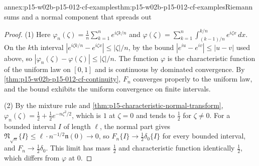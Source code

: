 \begin{annexitem}{annex:p15-w02b-p15-012-cf-examples}{thm:p15-w02b-p15-012-cf-examples}{Riemann sums and a normal component that spreads out}
\begin{proof}
(1) Here \(\varphi_n(\zeta)=\frac1n\sum_{k=1}^ne^{i\zeta k/n}\) and
\(\varphi(\zeta)=\sum_{k=1}^n\int_{(k-1)/n}^{k/n}e^{i\zeta x}\,dx\). On the
\(k\)th interval \(|e^{i\zeta k/n}-e^{i\zeta x}|\leq|\zeta|/n\), by the bound
\(|e^{iu}-e^{iv}|\leq|u-v|\) used above, so
\(|\varphi_n(\zeta)-\varphi(\zeta)|\leq|\zeta|/n\). The function \(\varphi\) is
the characteristic function of the uniform law on \([0,1]\) and is continuous
by dominated convergence. By \cref{thm:p15-w02b-p15-012-cf-continuity}, \(F_n\)
converges properly to the uniform law, and the bound exhibits the uniform
convergence on finite intervals.

(2) By the mixture rule and \cref{thm:p15-characteristic-normal-transform},
\(\varphi_n(\zeta)=\frac12+\frac12e^{-n\zeta^2/2}\), which is \(1\) at
\(\zeta=0\) and tends to \(\frac12\) for \(\zeta\neq0\). For a bounded interval
\(I\) of length \(\ell\), the normal part gives
\(\mathfrak N_{\sqrt n}\{I\}\leq\ell\cdot n^{-1/2}\mathfrak n(0)\to0\), so
\(F_n\{I\}\to\frac12\delta_0\{I\}\) for every bounded interval, and
\(F_n\to\frac12\delta_0\). This limit has mass \(\frac12\) and characteristic
function identically \(\frac12\), which differs from \(\varphi\) at \(0\).
\end{proof}
\end{annexitem}


